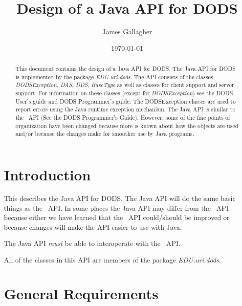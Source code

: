 \documentclass[12pt]{article}
\begin{document}
\title{Design of a Java API for DODS}
\author{James Gallagher}
\date{\today}

\maketitle

\begin{abstract}
  
  This document contains the design of a Java API for DODS.  The Java API for
  DODS is implemented by the package {\em EDU.uri.dods}. The API consists of
  the classes {\em DODSException}, {\em DAS}, {\em DDS}, {\em BaseType} as
  well as classes for client support and server support. For information on
  these classes (except for {\em DODSException}) see the DODS User's guide
  and DODS Programmer's guide. The DODSException classes are used to report
  errors using the Java runtime exception mechanism. The Java API is similar
  to the \Cpp\ API (See the DODS Programmer's Guide). However, some of the
  fine points of organization have been changed because more is known about
  how the objects are used and/or because the changes make for smoother use
  by Java programs.

\end{abstract}



\begin{htmlonly}
\end{htmlonly}

\clearpage

\tableofcontents

\clearpage

\section{Introduction}
\label{introduction}

This describes the Java API for DODS. The Java API will do the same basic
things as the \Cpp\ API\@. In some places the Java API may differ from the
\Cpp\ API because either we have learned that the \Cpp\ API could/should be
improved or because changes will make the API easier to use with Java.

The Java API {\em must} be able to interoperate with the \Cpp\ API\@.

All of the classes in this API are members of the package {\em EDU.uri.dods}.

\section{General Requirements}
\end{document}
